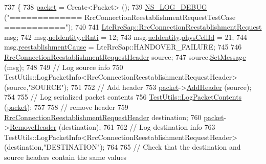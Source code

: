 \begin{DoxyCode}
737 \{
738   \hyperlink{classRrcHeaderTestCase_a6f0748c0e845f797497fbda1ca781803}{packet} = Create<Packet> ();
739   \hyperlink{group__logging_ga413f1886406d49f59a6a0a89b77b4d0a}{NS\_LOG\_DEBUG} (\textcolor{stringliteral}{"============= RrcConnectionReestablishmentRequestTestCase ==========="});
740 
741   \hyperlink{structns3_1_1LteRrcSap_1_1RrcConnectionReestablishmentRequest}{LteRrcSap::RrcConnectionReestablishmentRequest} msg;
742   msg.\hyperlink{structns3_1_1LteRrcSap_1_1RrcConnectionReestablishmentRequest_af4b77e49ed18202b2a340a1312088f5d}{ueIdentity}.\hyperlink{structns3_1_1LteRrcSap_1_1ReestabUeIdentity_aa5bbd6336e92bf028cb8841e6669f9e6}{cRnti} = 12;
743   msg.\hyperlink{structns3_1_1LteRrcSap_1_1RrcConnectionReestablishmentRequest_af4b77e49ed18202b2a340a1312088f5d}{ueIdentity}.\hyperlink{structns3_1_1LteRrcSap_1_1ReestabUeIdentity_a90790c6986fc2f29df81220832eb4834}{physCellId} = 21;
744   msg.\hyperlink{structns3_1_1LteRrcSap_1_1RrcConnectionReestablishmentRequest_a58dcbc5ec3a15e3007d8584992251386}{reestablishmentCause} = LteRrcSap::HANDOVER\_FAILURE;
745 
746   \hyperlink{classns3_1_1RrcConnectionReestablishmentRequestHeader}{RrcConnectionReestablishmentRequestHeader} source;
747   source.\hyperlink{classns3_1_1RrcConnectionReestablishmentRequestHeader_a4ce7922a616a0692d195cb49360dea7b}{SetMessage} (msg);
748 
749   \textcolor{comment}{// Log source info}
750   TestUtils::LogPacketInfo<RrcConnectionReestablishmentRequestHeader> (source,\textcolor{stringliteral}{"SOURCE"});
751 
752   \textcolor{comment}{// Add header}
753   \hyperlink{classRrcHeaderTestCase_a6f0748c0e845f797497fbda1ca781803}{packet}->\hyperlink{classns3_1_1Packet_a465108c595a0bc592095cbcab1832ed8}{AddHeader} (source);
754 
755   \textcolor{comment}{// Log serialized packet contents}
756   \hyperlink{classTestUtils_a9391dac3282094e6e57c0052d88a086f}{TestUtils::LogPacketContents} (\hyperlink{classRrcHeaderTestCase_a6f0748c0e845f797497fbda1ca781803}{packet});
757 
758   \textcolor{comment}{// remove header}
759   \hyperlink{classns3_1_1RrcConnectionReestablishmentRequestHeader}{RrcConnectionReestablishmentRequestHeader} destination;
760   \hyperlink{classRrcHeaderTestCase_a6f0748c0e845f797497fbda1ca781803}{packet}->\hyperlink{classns3_1_1Packet_a0961eccf975d75f902d40956c93ba63e}{RemoveHeader} (destination);
761 
762   \textcolor{comment}{// Log destination info}
763   TestUtils::LogPacketInfo<RrcConnectionReestablishmentRequestHeader> (destination,\textcolor{stringliteral}{"DESTINATION"});
764 
765   \textcolor{comment}{// Check that the destination and source headers contain the same values}

\end{DoxyCode}
